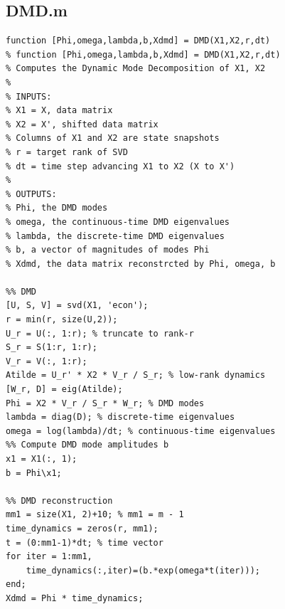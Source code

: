 \documentclass[a4paper]{article}
\begin{document}
\subsection{DMD.m}
\begin{lstlisting}[style=myMatlabstyle]
function [Phi,omega,lambda,b,Xdmd] = DMD(X1,X2,r,dt)
% function [Phi,omega,lambda,b,Xdmd] = DMD(X1,X2,r,dt)
% Computes the Dynamic Mode Decomposition of X1, X2
%
% INPUTS:
% X1 = X, data matrix
% X2 = X', shifted data matrix
% Columns of X1 and X2 are state snapshots
% r = target rank of SVD
% dt = time step advancing X1 to X2 (X to X')
%
% OUTPUTS:
% Phi, the DMD modes
% omega, the continuous-time DMD eigenvalues
% lambda, the discrete-time DMD eigenvalues
% b, a vector of magnitudes of modes Phi
% Xdmd, the data matrix reconstrcted by Phi, omega, b

%% DMD
[U, S, V] = svd(X1, 'econ');
r = min(r, size(U,2));
U_r = U(:, 1:r); % truncate to rank-r
S_r = S(1:r, 1:r);
V_r = V(:, 1:r);
Atilde = U_r' * X2 * V_r / S_r; % low-rank dynamics
[W_r, D] = eig(Atilde);
Phi = X2 * V_r / S_r * W_r; % DMD modes
lambda = diag(D); % discrete-time eigenvalues
omega = log(lambda)/dt; % continuous-time eigenvalues
%% Compute DMD mode amplitudes b
x1 = X1(:, 1);
b = Phi\x1;

%% DMD reconstruction
mm1 = size(X1, 2)+10; % mm1 = m - 1
time_dynamics = zeros(r, mm1);
t = (0:mm1-1)*dt; % time vector
for iter = 1:mm1,
	time_dynamics(:,iter)=(b.*exp(omega*t(iter)));
end;
Xdmd = Phi * time_dynamics;
\end{lstlisting}
\end{document}
